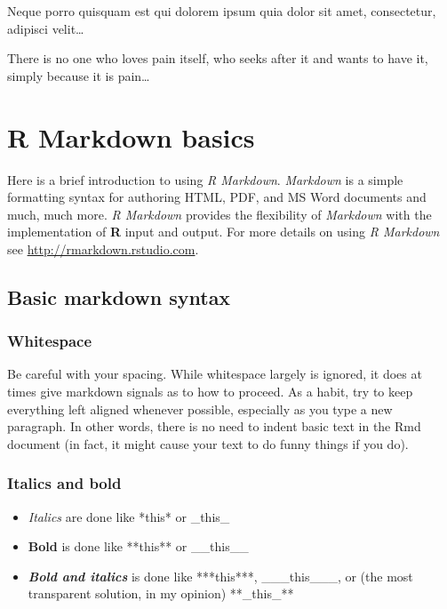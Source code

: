 \documentclass[a4paper, nobind]{templates/ociamthesis}
\providecommand{\tightlist}{%
  \setlength{\itemsep}{0pt}\setlength{\parskip}{0pt}}
\begin{document}
\begin{savequote}
Neque porro quisquam est qui dolorem ipsum quia dolor sit amet,
consectetur, adipisci velit\ldots{}

There is no one who loves pain itself, who seeks after it and wants to
have it, simply because it is pain\ldots{}
\end{savequote}



\chapter{R Markdown basics}\label{rmd-basics}

\minitoc 

\noindent Here is a brief introduction to using \emph{R Markdown}.
\emph{Markdown} is a simple formatting syntax for authoring HTML, PDF, and MS Word documents and much, much more.
\emph{R Markdown} provides the flexibility of \emph{Markdown} with the implementation of \textbf{R} input and output. For more details on using \emph{R Markdown} see \url{http://rmarkdown.rstudio.com}.

\section{Basic markdown syntax}\label{basic-markdown-syntax}

\subsection{Whitespace}\label{whitespace}

Be careful with your spacing.
While whitespace largely is ignored, it does at times give markdown signals as to how to proceed.
As a habit, try to keep everything left aligned whenever possible, especially as you type a new paragraph.
In other words, there is no need to indent basic text in the Rmd document (in fact, it might cause your text to do funny things if you do).

\subsection{Italics and bold}\label{italics-and-bold}

\begin{itemize}
\tightlist
\item
  \emph{Italics} are done like *this* or \_this\_
\item
  \textbf{Bold} is done like **this** or \_\_this\_\_
\item
  \textbf{\emph{Bold and italics}} is done like ***this***, \_\_\_this\_\_\_, or (the most transparent solution, in my opinion) **\_this\_**
\end{itemize}
\end{document}
